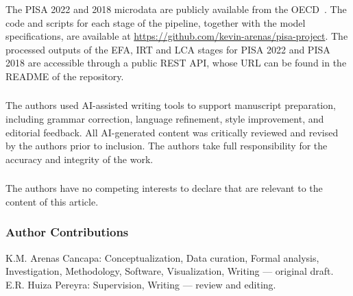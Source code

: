 \documentclass[runningheads]{llncs}
\begin{document}
The PISA 2022 and 2018 microdata are publicly available from the
OECD~\cite{oecd2024technical}. The code and scripts for each
stage of the pipeline, together with the model specifications,
are available at \url{https://github.com/kevin-arenas/pisa-project}.
The processed outputs of the EFA, IRT and LCA stages for PISA 2022
and PISA 2018 are accessible through a public REST API, whose URL
can be found in the README of the repository.

\begin{credits}
\subsubsection{\ackname}
The authors used AI-assisted writing tools to support
manuscript preparation, including grammar correction,
language refinement, style improvement, and editorial
feedback. All AI-generated content was critically reviewed
and revised by the authors prior to inclusion. The authors
take full responsibility for the accuracy and integrity
of the work.

\subsubsection{\discintname}
The authors have no competing interests to declare that are
relevant to the content of this article.

\subsubsection{Author Contributions}
K.M. Arenas Cancapa: Conceptualization, Data curation,
Formal analysis, Investigation, Methodology, Software,
Visualization, Writing --- original draft.
E.R. Huiza Pereyra: Supervision, Writing --- review
and editing.
\end{credits}



\end{document}
